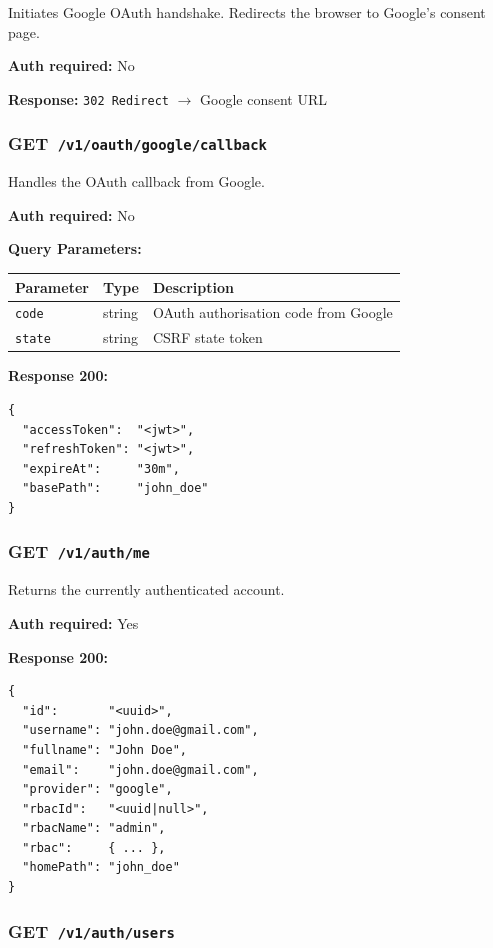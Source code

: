 \documentclass[12pt,a4paper]{article}
\newcommand{\httpget}[1]{%
  \colorbox{getcolor!20}{\textcolor{getcolor}{\textbf{\small GET}}}~\texttt{#1}%
}
\begin{document}
Initiates Google OAuth handshake. Redirects the browser to Google's consent page.

\textbf{Auth required:} No

\textbf{Response:} \texttt{302 Redirect} $\rightarrow$ Google consent URL

\vspace{0.5em}
\subsubsection{\httpget{/v1/oauth/google/callback}}

Handles the OAuth callback from Google.

\textbf{Auth required:} No

\textbf{Query Parameters:}

\begin{tabularx}{\linewidth}{llX}
\toprule
\textbf{Parameter} & \textbf{Type} & \textbf{Description} \\
\midrule
\texttt{code} & string & OAuth authorisation code from Google \\
\texttt{state} & string & CSRF state token \\
\bottomrule
\end{tabularx}

\textbf{Response 200:}
\begin{lstlisting}
{
  "accessToken":  "<jwt>",
  "refreshToken": "<jwt>",
  "expireAt":     "30m",
  "basePath":     "john_doe"
}
\end{lstlisting}

\vspace{0.5em}
\subsubsection{\httpget{/v1/auth/me}}

Returns the currently authenticated account.

\textbf{Auth required:} Yes

\textbf{Response 200:}
\begin{lstlisting}
{
  "id":       "<uuid>",
  "username": "john.doe@gmail.com",
  "fullname": "John Doe",
  "email":    "john.doe@gmail.com",
  "provider": "google",
  "rbacId":   "<uuid|null>",
  "rbacName": "admin",
  "rbac":     { ... },
  "homePath": "john_doe"
}
\end{lstlisting}

\vspace{0.5em}
\subsubsection{\httpget{/v1/auth/users}}
\end{document}
